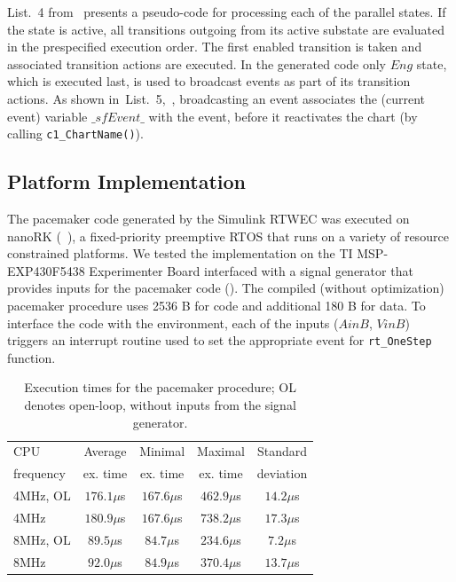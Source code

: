 List.~4 from~ presents a pseudo-code for processing each of the parallel states. If the state is active, all transitions outgoing from its active substate are evaluated in the prespecified execution order. The first enabled transition is taken and associated transition actions are executed. In the generated code only $Eng$ state, which is executed last, is used to broadcast events as part of its transition actions. As shown in~List.~5,~, broadcasting an event associates the (current event) variable $\_sfEvent\_$ with the event, before it reactivates the chart (by calling \texttt{c1\_ChartName()}). 



\subsection{Platform Implementation}
\label{sec:impl}
The pacemaker code generated by the Simulink RTWEC was executed on nanoRK (~\cite{nanork}), a fixed-priority preemptive RTOS that runs on a variety of resource constrained platforms. We tested the implementation on the TI MSP-EXP430F5438 Experimenter Board interfaced with a signal generator that provides inputs for the pacemaker code (). The compiled (without optimization) pacemaker procedure uses 2536 B for code and additional 180 B for data. To interface the code with the environment, each of the inputs ($AinB$, $VinB$) triggers an interrupt routine used to set the appropriate event for \texttt{rt\_OneStep} function.

\begin{table}[!b]
\center
{
\begin{tabular}{|l|c|c|c|c|}
\hline
CPU & Average & Minimal & Maximal & Standard \\ 
frequency & ex. time & ex. time & ex. time & deviation \\\hline
4MHz, OL	& $176.1\mu$s & $167.6\mu$s & $462.9\mu$s & $14.2\mu$s \\\hline
4MHz			& $180.9\mu$s & $167.6\mu$s & $738.2\mu$s & $17.3\mu$s \\\hline		
8MHz, OL	& $89.5\mu$s & $84.7\mu$s & $234.6\mu$s & $7.2\mu$s \\\hline
8MHz			& $92.0\mu$s & $84.9\mu$s & $370.4\mu$s & $13.7\mu$s \\\hline
\end{tabular}
}
\caption{Execution times for the pacemaker procedure; OL denotes open-loop, without inputs from the signal generator.}
\label{tab:MSP430exec_time}

\end{table}


